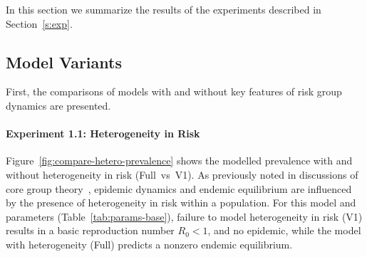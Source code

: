In this section we summarize the results of the experiments described in Section~\ref{s:exp}.
\subsection{Model Variants}\label{ss:res-variants}
First, the comparisons of models with and without
key features of risk group dynamics are presented.
\paragraph{Experiment 1.1: Heterogeneity in Risk}\label{p:res-1-hetero}
Figure~\ref{fig:compare-hetero-prevalence} shows the modelled prevalence
with and without heterogeneity in risk (Full~vs~V1).
As previously noted in discussions of core group theory~\citep{Yorke1978,Stigum1994},
epidemic dynamics and endemic equilibrium are influenced by the presence of
heterogeneity in risk within a population.
For this model and parameters (Table~\ref{tab:params-base}),
failure to model heterogeneity in risk (V1) results in
a basic reproduction number $R_0 < 1$, and no epidemic,
while the model with heterogeneity (Full) predicts a nonzero endemic equilibrium.
